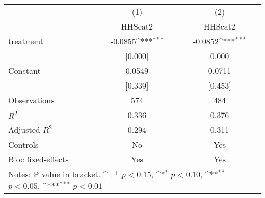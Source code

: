 {
\def\sym#1{\ifmmode^{#1}\else\(^{#1}\)\fi}
\begin{tabular*}{1.2\hsize}{@{\hskip\tabcolsep\extracolsep\fill}l*{2}{c}}
\cline{1-3}\cline{1-3}
     &\multicolumn{1}{c}{(1)}&\multicolumn{1}{c}{(2)}\\
     &\multicolumn{1}{c}{HHScat2}&\multicolumn{1}{c}{HHScat2}\\
\cline{1-3}
treatment&-0.0855\sym{***}&-0.0852\sym{***}\\
     &[0.000]         &[0.000]         \\
[1em]
Constant&0.0549         &0.0711         \\
     &[0.339]         &[0.453]         \\
\cline{1-3}
Observations&574         &484         \\
\(R^{2}\)&0.336         &0.376         \\
Adjusted \(R^{2}\)&0.294         &0.311         \\
Controls&No         &Yes         \\
Bloc fixed-effects&Yes         &Yes         \\
\cline{1-3}\cline{1-3}
\multicolumn{3}{p{1.0\textwidth}}{\footnotesize Notes: P value in bracket. \sym{+} \(p<0.15\), \sym{*} \(p<0.10\), \sym{**} \(p<0.05\), \sym{***} \(p<0.01\)}\\
\end{tabular*}
}
